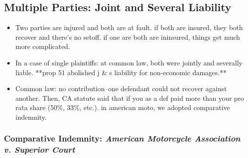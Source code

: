 \subsection{Multiple Parties: Joint and Several Liability}

\begin{itemize}
    \item Two parties are injured and both are at fault. if both are insured, they both recover and there's no setoff. if one are both are ininsured, things get much more complicated.
    \item In a case of single plaintiffs: at common law, both were jointly and severally liable. **prop 51 abolished j & s liability for non-economic damages.**
    \item Common law: no contribution--one defendant could not recover against another. Then, CA statute said that if you as a def paid more than your pro rata share (50\%, 33\%, etc.). in american moto, we adopted comparative indemnity.
\end{itemize}

\subsubsection{Comparative Indemnity: \emph{American Motorcycle Association v. Superior Court}}

